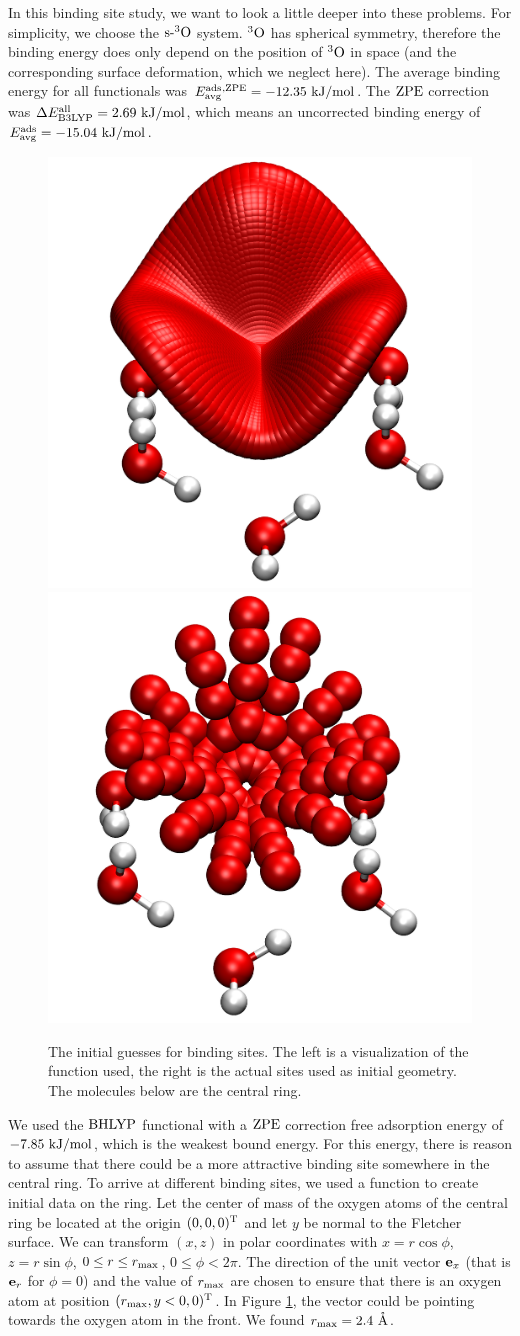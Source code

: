 \documentclass[8.5pt,twoside,twocolumn]{article}
\newcommand\zpe{\enmat{\te{ZPE}}}
\newcommand\eall{\enmat{E^{\te{all}}}}
\newcommand\sur{\enmat{\te{s-}}}
\renewcommand{\Ang}{\mathring{\te{A}}}
\newcommand\tripo{\enmat{{^3\te{O}}}}
\newcommand\kmo{\enmat{\te {kJ/mol}}}
\theoremstyle{standard}
\begin{document}
In this binding site study, we want to look a little deeper into these problems. For
simplicity, we choose the $\sur\tripo$ system. $\tripo$ has spherical symmetry, 
therefore the binding energy does only depend on the position of $\tripo$ in space
(and the corresponding surface deformation, which we neglect here). 
The average binding energy for
all functionals was \mbox{$\avg{^{\te{,ZPE}}}=-12.35~\kmo$}. The $\zpe$ correction was
\mbox{$\Dl\eall_{\btlyp}=2.69~\kmo$}, which means an uncorrected binding energy
of \mbox{$\avg=-15.04~\kmo$}.

\begin{figure}[ht]
\includegraphics[width=.24\textwidth]{./img/SiteSnapshotMany.png}
\includegraphics[width=.24\textwidth]{./img/SiteSnapshotOriginal.png}
\caption{The initial guesses for binding sites. The left is a visualization of the function
used, the right is the actual sites used as initial geometry. The molecules
below are the central ring.}
\label{Fig:Adv:BindingSitesGuess}
\end{figure}

We used the $\text{BHLYP}$ functional with a $\zpe$ correction free adsorption energy 
of $-7.85~\kmo$, which is the weakest bound energy. For this energy,
there is reason to assume that there could be a more attractive binding site
somewhere in the central ring. To arrive at different binding sites, we used
a function to create initial data on the ring. Let the center of mass of the oxygen
atoms of the central ring be located at the origin $(0,0,0)^{\text T}$ and let $y$ be
normal to the Fletcher surface. We can transform $(x,z)$ in polar coordinates with
$x=r \cos \phi$, $z=r \sin\phi$, $0 \leq r \leq r_{\text{max}}$, $0 \leq \phi<2\pi$. The direction of the
unit vector $\mathbf{e}_x$ (that is $\mathbf{e}_r$ for $\phi=0$) and the value of $r_{\text{max}}$ are
chosen to ensure that there is an oxygen atom at position $(r_{\text{max}},y < 0,0)^{\text T}$. In
Figure \ref{Fig:Adv:BindingSitesGuess}, the vector could be pointing towards the oxygen
atom in the front. We found $\rmax=2.4~\Ang$.
\end{document}

